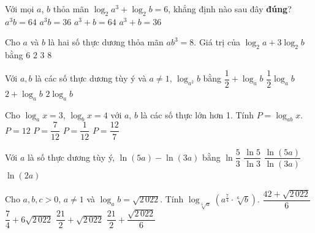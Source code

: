 \begin{ex}%
	Với mọi $a$, $b$ thỏa  mãn $\log_2a^3+\log_2b=6$, khẳng định nào sau đây \textbf{đúng}?
	\choice 
		{\True $a^3b=64$} 
		 {$a^3b=36$}
		{$a^3+b=64$} 
		 {$a^3+b=36$}
\end{ex}

\begin{ex}%
	[Mã 104 2019]  Cho $a$ và $b$ là hai số thực dương thỏa mãn $ab^3=8$. Giá trị của $\log_2a+3\log_2b$ bằng
	\choice 
		 {$6$}
		 {$2$}
		{\True  $3$}
		 {$8$}
\end{ex}

\begin{ex}%
	[Mã 102 - 2020 Lần 1] Với $a, b$ là các số thực dương tùy  ý và $a\neq 1$, $\log_{a^2}b$ bằng
	\choice 
		{$\dfrac{1}{2}+\log _a  b$}
		 {\True $\dfrac{1}{2} \log _a b$}
		{$2+\log _a b$} 
		 {$2 \log _a b$}
\end{ex}

\begin{ex}%
	Cho $\log_{a}x=3$, $\log_{b}x=4$ với $a$, $b$ là các số thực lớn hơn 1. Tính $P=\log_{ab}x$. 
	 \choice
		 {$P=12$}
		 {$P=\dfrac{7}{12}$}
		{$P=\dfrac{1}{12}$} 
		 {\True $P=\dfrac{12}{7}$}
\end{ex}

\begin{ex}%
	[Mã 101 2018]  Với $a$ là số thực dương tùy ý, $\ln (5a)-\ln (3a)$ bằng
	 \choice
		{\True $\ln  \dfrac{5}{3}$}
		{$\dfrac{\ln 5}{\ln 3}$} 
		{$\dfrac{\ln (5a)}{\ln (3a)}$} 
		 {$\ln (2a)$}
\end{ex}

\begin{ex}%
	Cho $a,b,c>0$, $a\ne1$ và $\log_{a}b=\sqrt{2\,022}$.  Tính $\log_{\sqrt[6]{a}}\left(a^{\tfrac{7}{4}}\cdot\sqrt[6]{b}\right)$.
	\choice 
		 {$\dfrac{42+\sqrt{2\,022}}{6}$}
		{$\dfrac{7}{4}+6\sqrt{2\,022}$} 
		{\True $\dfrac{21}{2}+\sqrt{2\,022}$} 
		{$\dfrac{21}{2}+\dfrac{\sqrt{2\,022}}{6}$} 
\end{ex}

